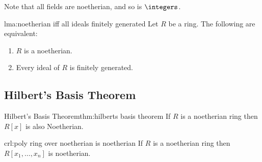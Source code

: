 Note that all fields are noetherian, and so is \(\integers\).

\begin{lma}{}{lma:noetherian iff all ideals finitely generated}
    Let \(R\) be a ring.
    The following are equivalent:
    \begin{enumerate}
        \item \(R\) is a noetherian.
        \item Every ideal of \(R\) is finitely generated.
    \end{enumerate}
\end{lma}

\subsection{Hilbert's Basis Theorem}
\begin{thm}{Hilbert's Basis Theorem}{thm:hilberts basis theorem}
    If \(R\) is a noetherian ring then \(R[x]\) is also Noetherian.
\end{thm}

\begin{crl}{}{crl:poly ring over noetherian is noetherian}
    If \(R\) is a noetherian ring then \(R[x_1, \dotsc, x_n]\) is noetherian.
\end{crl}

